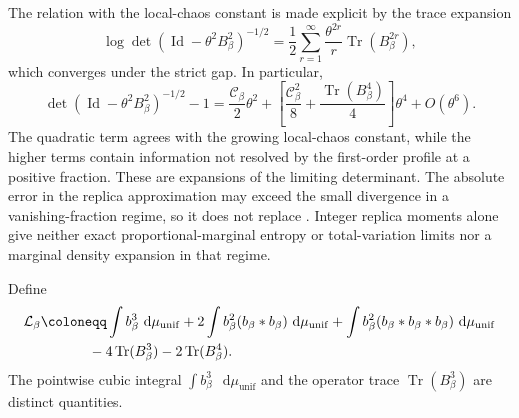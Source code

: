\documentclass[11pt,reqno]{amsart}
\numberwithin{equation}{section}
\theoremstyle{plain}
\theoremstyle{definition}
\newcommand{\dd}{\mathop{}\!\mathrm d}
\newcommand{\Id}{\operatorname{Id}}
\newcommand{\Tr}{\operatorname{Tr}}
\newcommand{\be}{\beta}
\newcommand{\muunif}{\mu_{\mathrm{unif}}}
\begin{document}
The relation with the local-chaos constant is made explicit by the trace expansion
\begin{equation}
 \log\det(\Id-\theta^2B_\be^2)^{-1/2}
 =\frac12\sum_{r=1}^{\infty}\frac{\theta^{2r}}r\Tr(B_\be^{2r}),
 \label{eq:main-overlap-log}
\end{equation}
which converges under the strict gap. In particular,
\begin{equation}
 \det(\Id-\theta^2B_\be^2)^{-1/2}-1
 =\frac{\mathcal C_\be}{2}\theta^2
 +\left[\frac{\mathcal C_\be^2}{8}+\frac{\Tr(B_\be^4)}4\right]\theta^4
 +O(\theta^6).
 \label{eq:main-overlap-expansion}
\end{equation}
The quadratic term agrees with the growing local-chaos constant, while the higher terms contain information not resolved by the first-order profile at a positive fraction. These are expansions of the limiting determinant. The absolute error in the replica approximation may exceed the small divergence in a vanishing-fraction regime, so it does not replace . Integer replica moments alone give neither exact proportional-marginal entropy or total-variation limits nor a marginal density expansion in that regime.

Define
\begin{align}
 \mathcal L_{\be}
 &\coloneqq
 \int b_{\be}^3\,\dd\muunif
 +2\int b_{\be}^2(b_{\be}*b_{\be})\,\dd\muunif
 +\int b_{\be}^2(b_{\be}*b_{\be}*b_{\be})\,\dd\muunif
 \notag\\
 &\hspace{12mm}
 -4\Tr(B_{\be}^3)-2\Tr(B_{\be}^4).
 \label{eq:higher-order-L}
\end{align}
The pointwise cubic integral $\int b_{\be}^3\,\dd\muunif$ and the operator trace $\Tr(B_{\be}^3)$ are distinct quantities.
\end{document}
